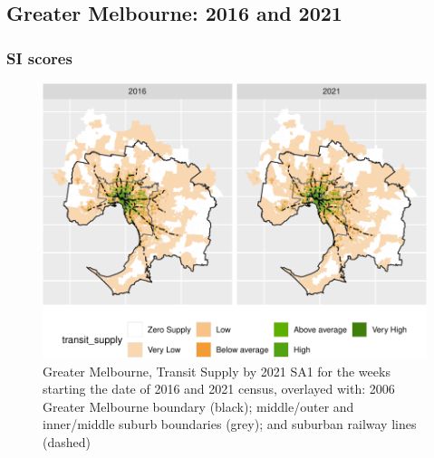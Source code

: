 \documentclass[preprint, 3p,
authoryear]{elsarticle} %
\begin{document}
\subsection{Greater Melbourne: 2016 and
2021}\label{greater-melbourne-2016-and-2021}

\subsubsection{SI scores}\label{si-scores-1}

\begin{figure}
\centering
\includegraphics{Leveraging_GTFS_to_assess_transit_supply_Transport_Geography_files/figure-latex/Greater_Melbourne_2016_2021_plot-1.pdf}
\caption{Greater Melbourne, Transit Supply by 2021 SA1 for the weeks
starting the date of 2016 and 2021 census, overlayed with: 2006 Greater
Melbourne boundary (black); middle/outer and inner/middle suburb
boundaries (grey); and suburban railway lines (dashed)}
\end{figure}
\end{document}
